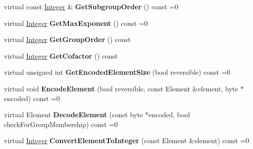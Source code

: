 \begin{DoxyCompactItemize}
\item 
\hypertarget{class_d_l___group_parameters_aeff4e59562d2c9b0ffc6b677e8ce409a}{
virtual const \hyperlink{class_integer}{Integer} \& {\bfseries GetSubgroupOrder} () const =0}
\label{class_d_l___group_parameters_aeff4e59562d2c9b0ffc6b677e8ce409a}

\item 
\hypertarget{class_d_l___group_parameters_a7275e04a4d21d985e698bb191e6cbdf1}{
virtual \hyperlink{class_integer}{Integer} {\bfseries GetMaxExponent} () const =0}
\label{class_d_l___group_parameters_a7275e04a4d21d985e698bb191e6cbdf1}

\item 
\hypertarget{class_d_l___group_parameters_a3a92b3858c4326162ce8130ac14b9c30}{
virtual \hyperlink{class_integer}{Integer} {\bfseries GetGroupOrder} () const }
\label{class_d_l___group_parameters_a3a92b3858c4326162ce8130ac14b9c30}

\item 
\hypertarget{class_d_l___group_parameters_af2b056922363df906623d96aa803dd90}{
virtual \hyperlink{class_integer}{Integer} {\bfseries GetCofactor} () const }
\label{class_d_l___group_parameters_af2b056922363df906623d96aa803dd90}

\item 
\hypertarget{class_d_l___group_parameters_a8ef60e89b4f1cc0b72f672c19ed43fc7}{
virtual unsigned int {\bfseries GetEncodedElementSize} (bool reversible) const =0}
\label{class_d_l___group_parameters_a8ef60e89b4f1cc0b72f672c19ed43fc7}

\item 
\hypertarget{class_d_l___group_parameters_a71c6058bd5ddcd54bd36565b0ba0cae0}{
virtual void {\bfseries EncodeElement} (bool reversible, const Element \&element, byte $\ast$encoded) const =0}
\label{class_d_l___group_parameters_a71c6058bd5ddcd54bd36565b0ba0cae0}

\item 
\hypertarget{class_d_l___group_parameters_af3dc6d48394c356bb30dc72371aa02e7}{
virtual Element {\bfseries DecodeElement} (const byte $\ast$encoded, bool checkForGroupMembership) const =0}
\label{class_d_l___group_parameters_af3dc6d48394c356bb30dc72371aa02e7}

\item 
\hypertarget{class_d_l___group_parameters_afb36d983bb45fe3b8acb1767c0060700}{
virtual \hyperlink{class_integer}{Integer} {\bfseries ConvertElementToInteger} (const Element \&element) const =0}
\label{class_d_l___group_parameters_afb36d983bb45fe3b8acb1767c0060700}


\end{DoxyCompactItemize}
